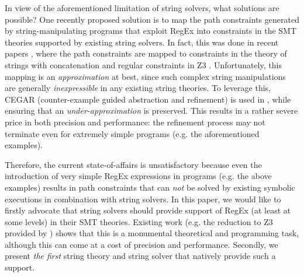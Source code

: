 In view of the aforementioned limitation of string solvers, what solutions are
possible? One recently proposed solution is to map the path constraints
generated by string-manipulating programs that exploit RegEx into constraints
in the SMT theories
supported by existing string solvers. In fact, this was done in recent papers
\cite{aratha,LMK19}, where the path constraints are mapped to constraints
in the theory of strings with concatenation and regular constraints in Z3 
\cite{Z3}. Unfortunately, this mapping is an \emph{approximation} at best, since
such complex string manipulations are generally \emph{inexpressible} in any 
existing string theories. To leverage this, CEGAR (counter-example guided 
abstraction and refinement) is used in \cite{LMK19}, while ensuring that an
\emph{under-approximation} is preserved. 
This results in a rather severe price in both precision and performance: the
refinement process may not terminate even for extremely simple programs
(e.g. the aforementioned examples). 

Therefore, the current state-of-affairs is unsatisfactory because even 
the introduction of very simple RegEx expressions in programs (e.g. the above 
examples) results in path constraints that can \emph{not} be solved by existing 
symbolic executions in combination with string solvers. In this paper, we would
like to firstly advocate that string solvers should provide support of RegEx 
(at least at some levels) in their SMT theories. Existing work
(e.g. the reduction to Z3 provided by \cite{LMK19}) shows that this is a 
monumental theoretical and programming task, although this can come at a 
cost of precision and performance. Secondly, we present \emph{the first} string
theory and string solver that natively provide such a support.



%
%

